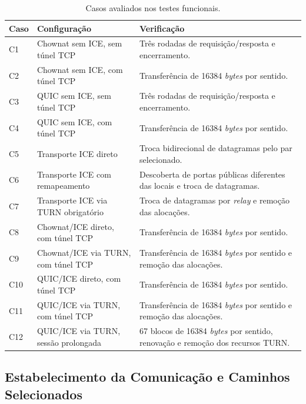 \begin{table}[htbp]
    \centering
    \caption{Casos avaliados nos testes funcionais.}
    \label{tab:functional_cases}
    \small
    \begin{tabular}{@{}p{}p{}p{}@{}}
        \toprule
        \textbf{Caso} & \textbf{Configuração} & \textbf{Verificação} \\
        \midrule
        C1 & Chownat sem ICE, sem túnel TCP & Três rodadas de requisição/resposta e encerramento. \\
        C2 & Chownat sem ICE, com túnel TCP & Transferência de 16384 \textit{bytes} por sentido. \\
        C3 & QUIC sem ICE, sem túnel TCP & Três rodadas de requisição/resposta e encerramento. \\
        C4 & QUIC sem ICE, com túnel TCP & Transferência de 16384 \textit{bytes} por sentido. \\
        C5 & Transporte ICE direto & Troca bidirecional de datagramas pelo par selecionado. \\
        C6 & Transporte ICE com remapeamento & Descoberta de portas públicas diferentes das locais e troca de datagramas. \\
        C7 & Transporte ICE via TURN obrigatório & Troca de datagramas por \textit{relay} e remoção das alocações. \\
        C8 & Chownat/ICE direto, com túnel TCP & Transferência de 16384 \textit{bytes} por sentido. \\
        C9 & Chownat/ICE via TURN, com túnel TCP & Transferência de 16384 \textit{bytes} por sentido e remoção das alocações. \\
        C10 & QUIC/ICE direto, com túnel TCP & Transferência de 16384 \textit{bytes} por sentido. \\
        C11 & QUIC/ICE via TURN, com túnel TCP & Transferência de 16384 \textit{bytes} por sentido e remoção das alocações. \\
        C12 & QUIC/ICE via TURN, sessão prolongada & 67 blocos de 16384 \textit{bytes} por sentido, renovação e remoção dos recursos TURN. \\
        \bottomrule
    \end{tabular}
\end{table}

\subsection{Estabelecimento da Comunicação e Caminhos Selecionados}
\label{sec:functional_establishment}

